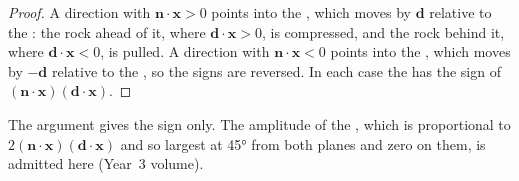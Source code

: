 \begin{proof}
A direction with $\mathbf n\cdot\mathbf x > 0$ points into the ,
which moves by $\mathbf d$ relative to the : the rock ahead of it,
where $\mathbf d\cdot\mathbf x > 0$, is compressed, and the rock behind it,
where $\mathbf d\cdot\mathbf x < 0$, is pulled. A direction with
$\mathbf n\cdot\mathbf x < 0$ points into the , which moves by
$-\mathbf d$ relative to the , so the signs are reversed. In each
case the  has the sign of $(\mathbf n\cdot\mathbf x)(\mathbf
d\cdot\mathbf x)$.
\end{proof}

The argument gives the sign only. The amplitude of the , which is
proportional to $2(\mathbf n\cdot\mathbf x)(\mathbf d\cdot\mathbf x)$ and so
largest at \ang{45} from both planes and zero on them, is admitted here
(Year~3 volume).

